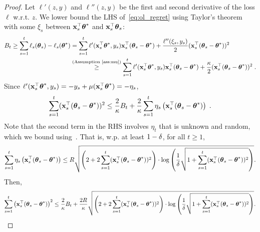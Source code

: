 \begin{proof}
  Let $\ell'(z,y)$ and $\ell''(z,y)$ be the first and second derivative of the loss $\ell$ w.r.t. $z$.
  We lower bound the LHS of~\eqref{eq:ol_regret} using Taylor's theorem with some $\xi_s$ between $\mathbf{x}_s^{\top}{{\boldsymbol \theta}}^*$ and $\mathbf{x}_s^{\top}{{\boldsymbol \theta}}_s$:
  \vspace{-4pt}
  \begin{equation*}\begin{aligned}
      B_t 
      \ge \sum_{s=1}^t \ell_s({{\boldsymbol \theta}}_s) - \ell_s({{\boldsymbol \theta}}^*) 
      &= \sum_{s=1}^t \ell'(\mathbf{x}_s^{\top}{{\boldsymbol \theta}}^*, y_s) \mathbf{x}_s^{\top}({{\boldsymbol \theta}}_s - {{\boldsymbol \theta}}^*) + { \frac{\ell''(\xi_s,y_s)}{2} } (\mathbf{x}_s^{\top}({{\boldsymbol \theta}}_s - {{\boldsymbol \theta}}^*))^2
  \\&\stackrel{\text{(\text{Assumption~\ref{ass:mu}})}}{\ge} 
         \sum_{s=1}^t \ell'(\mathbf{x}_s^{\top}{{\boldsymbol \theta}}^*,y_s) \mathbf{x}_s^{\top}({{\boldsymbol \theta}}_s - {{\boldsymbol \theta}}^*) + { \frac{\kappa}{2} } (\mathbf{x}_s^{\top}({{\boldsymbol \theta}}_s - {{\boldsymbol \theta}}^*))^2  \;.
  \end{aligned} \end{equation*}
  Since $\ell'(\mathbf{x}_s^{\top}{{\boldsymbol \theta}}^*,y_s) = -y_s + \mu(\mathbf{x}_s^{\top}{{\boldsymbol \theta}}^*) = -\eta_s$,
  \vspace{-4pt}
  \begin{equation*}\begin{aligned}
    \sum_{s=1}^t (\mathbf{x}_s^{\top}({{\boldsymbol \theta}}_s - {{\boldsymbol \theta}}^*))^2  \le { \frac{2}{\kappa} } B_t + { \frac{2}{\kappa} }\sum_{s=1}^t \eta_s \left(\mathbf{x}_s^{\top}({{\boldsymbol \theta}}_s - {{\boldsymbol \theta}}^*)\right) \;.
  \end{aligned}
  \end{equation*}
  Note that the second term in the RHS involves $\eta_t$ that is unknown and random, which we bound using~\citet[Corollary 8]{ay12online}. 
  That is, w.p. at least $1-{\delta}$, for all $t\ge1$,
  \vspace{-4pt}
  \begin{equation*}
    \sum_{s=1}^t \eta_s  \left(\mathbf{x}_s^{\top}({{\boldsymbol \theta}}_s - {{\boldsymbol \theta}}^*)\right) 
    \le R\sqrt{\left(2 + 2\sum_{s=1}^t (\mathbf{x}_s^{\top}({{\boldsymbol \theta}}_s-{{\boldsymbol \theta}}^*))^2\right) \cdot\log\left( { \frac{1}{{\delta}} } \sqrt{1+\sum_{s=1}^t (\mathbf{x}_s^{\top}({{\boldsymbol \theta}}_s-{{\boldsymbol \theta}}^*))^2 } \right)} .
  \end{equation*}
  Then,
  \vspace{-4pt}
  \begin{equation*}\begin{aligned}
      \sum_{s=1}^t \lt(\x_s^\T(\th_s - \th^*) \rt)^2 \le \fr{2}{\kappa}B_t + \fr{2 R}{\kappa} \sqrt{\lt(2 + 2\sum_{s=1}^t (\x_s^\T(\th_s-\th^*))^2\rt) \cdot\log\lt( \fr{1}{\dt} \sqrt{1+\sum_{s=1}^t (\x_s^\T(\th_s-\th^*))^2 } \rt)} . 

\end{aligned}
\end{equation*}
\end{proof}
